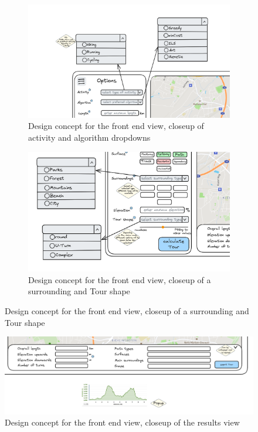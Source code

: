\begin{figure}[H]
	\begin{subfigure}[t]{0.49\linewidth}
		\centering
		\includegraphics[width=\linewidth]{bilder/Concept closeup activity, algorithm.png}
		\caption{Design concept for the front end view, closeup of activity and algorithm dropdowns}
		\label{fig:frontendConceptCloseupDropdowns}	
	\end{subfigure}
	\hfill
	\begin{subfigure}[t]{0.49\linewidth}
		\centering
		\includegraphics[width=\linewidth]{bilder/Concept closeup surroundings, tour shape.png}
		\caption{Design concept for the front end view, closeup of a surrounding and Tour shape}
		\label{fig:frontendConceptCloseupButtons}		
	\end{subfigure}
\end{figure}


\begin{figure}[H]
	\includegraphics[width=0.9\linewidth]{bilder/Concept closeup tour stats, elevation profile.png}
	\caption{Design concept for the front end view, closeup of the results view}
	\label{fig:frontendConceptResultsCloseup}
\end{figure}



